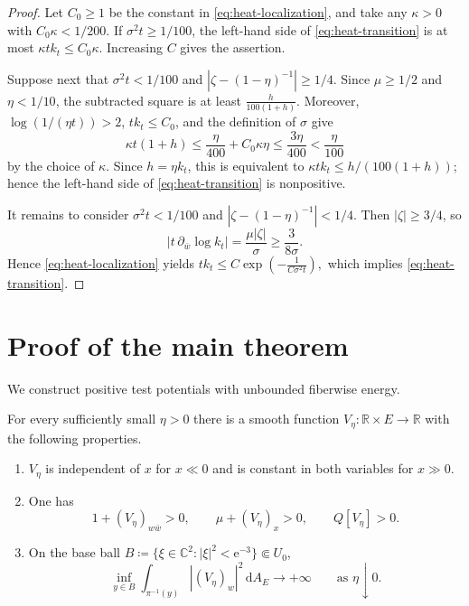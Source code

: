 \documentclass[11pt,a4paper]{article}
\begin{document}
	\begin{proof}
		Let $C_0\ge1$ be the constant in \eqref{eq:heat-localization},
		and take any $\kappa>0$ with $C_0\kappa<1/200$.
		If $\sigma^2t\ge1/100$, the left-hand side of
		\eqref{eq:heat-transition} is at most $\kappa tk_t\le C_0\kappa$.
		Increasing $C$ gives the assertion.

		Suppose next that $\sigma^2t<1/100$ and
		$|\zeta-(1-\eta)^{-1}|\ge1/4$.  Since $\mu\ge1/2$ and
		$\eta<1/10$, the subtracted square is at least
		\(
			\frac{h}{100(1+h)}.
		\)
		Moreover, $\log(1/(\eta t))>2$, $tk_t\le C_0$, and the definition
		of $\sigma$ give
		\[
			\kappa t(1+h)
			\le\frac{\eta}{400}+C_0\kappa\eta
			\le\frac{3\eta}{400}<\frac{\eta}{100}
		\]
		by the choice of $\kappa$.  Since $h=\eta k_t$, this is
		equivalent to $\kappa tk_t\le h/(100(1+h))$; hence the left-hand
		side of \eqref{eq:heat-transition} is nonpositive.

		It remains to consider $\sigma^2t<1/100$ and
		$|\zeta-(1-\eta)^{-1}|<1/4$.  Then $|\zeta|\ge3/4$, so
		\[
			\bigl|t\,\partial_{\bar w}\log k_t\bigr|
			=\frac{\mu|\zeta|}{\sigma}\ge\frac{3}{8\sigma}.
		\]
		Hence \eqref{eq:heat-localization} yields
		\(
			tk_t\le C\exp\left(-\frac1{C\sigma^2t}\right),
		\)
	which implies
		\eqref{eq:heat-transition}.
	\end{proof}

	\section{Proof of the main theorem}
	
	We construct positive test potentials with unbounded
	fiberwise energy.

	\begin{proposition}\label{prop:transport}
		For every sufficiently small $\eta>0$ there is a smooth function
		$V_\eta\colon\mathbb R\times E\to\mathbb R$ with the following
		properties.
		\begin{enumerate}[label={(\arabic*)},ref={(\arabic*)}]
			\item\label{it:V-ends}
			$V_\eta$ is independent of $x$ for $x\ll0$ and is constant in
			both variables for $x\gg0$.
			\item\label{it:V-positivity}
			One has
			\[
				1+(V_\eta)_{w\bar w}>0,
				\qquad
				\mu+(V_\eta)_x>0,
				\qquad
				Q[V_\eta]>0.
			\]
			\item\label{it:V-energy}
			On the base ball
			$B\coloneqq\{\xi\in\mathbb C^2:|\xi|^2<\mathrm{e}^{-3}\}\Subset U_0$,
			\[
				\inf_{y\in B}
				\int_{\pi^{-1}(y)} |(V_\eta)_w|^2\,\mathrm{d}A_E
				\longrightarrow +\infty
				\qquad\text{as }\eta\downarrow0 .
			\]
		\end{enumerate}
	\end{proposition}
\end{document}
